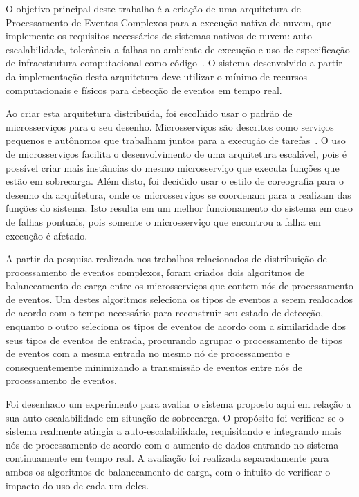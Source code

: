 O objetivo principal deste trabalho é a criação de uma arquitetura de Processamento de Eventos Complexos para a execução nativa de nuvem, que implemente os requisitos necessários de sistemas nativos de nuvem: auto-escalabilidade, tolerância a falhas no ambiente de execução e uso de especificação de infraestrutura computacional como código~\citep{garrison2017cloud}. O sistema desenvolvido a partir da implementação desta arquitetura deve utilizar o mínimo de recursos computacionais e físicos para detecção de eventos em tempo real.

Ao criar esta arquitetura distribuída, foi escolhido usar o padrão de microsserviços para o seu desenho. Microsserviços são descritos como serviços pequenos e autônomos que trabalham juntos para a execução de tarefas~\citep{Newman:2015:BM:2904388}. O uso de microsserviços facilita o desenvolvimento de uma arquitetura escalável, pois é possível criar mais instâncias do mesmo microsserviço que executa funções que estão em sobrecarga. Além disto, foi decidido usar o estilo de coreografia para o desenho da arquitetura, onde os microsserviços se coordenam para a realizam das funções do sistema. Isto resulta em um melhor funcionamento do sistema em caso de falhas pontuais, pois somente o microsserviço que encontrou a falha em execução é afetado.

A partir da pesquisa realizada nos trabalhos relacionados de distribuição de processamento de eventos complexos, foram  criados dois algoritmos de balanceamento de carga entre os microsserviços que contem nós de processamento de eventos. Um destes algoritmos seleciona os tipos de eventos a serem realocados de acordo com o tempo necessário para reconstruir seu estado de detecção, enquanto o outro seleciona os tipos de eventos de acordo com a similaridade dos seus tipos de eventos de entrada, procurando agrupar o processamento de tipos de eventos com a mesma entrada no mesmo nó de processamento e consequentemente minimizando a transmissão de eventos entre nós de processamento de eventos.

Foi desenhado um experimento para avaliar o sistema proposto aqui em relação a sua auto-escalabilidade em situação de sobrecarga. O propósito foi verificar se o sistema realmente atingia a auto-escalabilidade, requisitando e integrando mais nós de processamento de acordo com o aumento de dados entrando no sistema continuamente em tempo real. A avaliação foi realizada separadamente para ambos os algoritmos de balanceamento de carga, com o intuito de verificar o impacto do uso de cada um deles.


